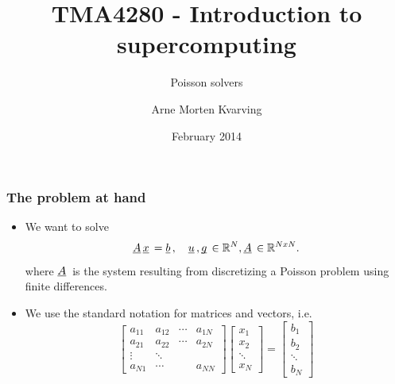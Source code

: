 \documentclass{beamer}
\title{TMA4280 - Introduction to supercomputing}
\subtitle{Poisson solvers}
\author{Arne Morten Kvarving}
\institute{NTNU and SINTEF ICT}
\date{February 2014}
\newcommand{\ub}[1]{\underbar{$#1$}\,}
\begin{document}
\maketitle
\begin{frame}\frametitle{The problem at hand}
  \begin{itemize}
    \item We want to solve
      \[
        \ub{A}\ub{x} = \ub{b},\quad \ub{u},\ub{g} \in \mathbb{R}^N, \ub{A} \in \mathbb{R}^{NxN}.
      \]
      where $\ub{A}$ is the system resulting from discretizing a Poisson problem using finite differences.
    \item We use the standard notation for matrices and vectors, i.e.
      \[
        \begin{bmatrix}
          a_{11} & a_{12} & \cdots & a_{1N} \\
          a_{21} & a_{22} & \cdots & a_{2N} \\
          \vdots & \ddots \\
          a_{N1} & \cdots & & a_{NN}
        \end{bmatrix}	\begin{bmatrix}
          x_1 \\
          x_2 \\
          \ddots \\
          x_N
        \end{bmatrix} = \begin{bmatrix}
          b_1\\
          b_2 \\
          \ddots\\
          b_N
        \end{bmatrix}
      \]
  \end{itemize}
\end{frame}
\end{document}
